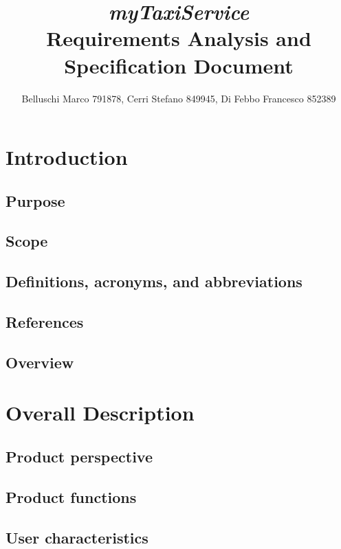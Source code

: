 \documentclass[]{report}
\title{{\Huge\textit{myTaxiService}}\\{\Large Requirements Analysis and Specification Document}}
\author{Belluschi Marco 791878, Cerri Stefano 849945, Di Febbo Francesco 852389}
\begin{document}
\maketitle
\tableofcontents

\chapter{Introduction}

\section{Purpose}


\section{Scope}


\section{Definitions, acronyms, and abbreviations}


\section{References}


\section{Overview}


\chapter{Overall Description}

\section{Product perspective}


\section{Product functions}


\section{User characteristics}

\end{document}
